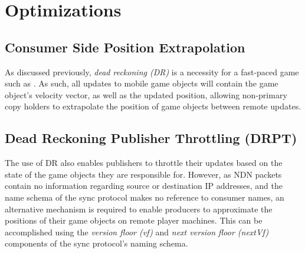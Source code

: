 




\section{\game{} Optimizations}\label{sec:des:dr}
\subsection{Consumer Side Position Extrapolation}
As discussed previously, \textit{dead reckoning (DR)} is a necessity for a fast-paced game such as \game{}. As such, all updates to mobile game objects will contain the game object's velocity vector, as well as the updated position, allowing non-primary copy holders to extrapolate the position of game objects between remote updates.

\subsection{Dead Reckoning Publisher Throttling (DRPT)}
The use of DR also enables publishers to throttle their updates based on the state of the game objects they are responsible for. However, as NDN packets contain no information regarding source or destination IP addresses, and the name schema of the sync protocol makes no reference to consumer names, an alternative mechanism is required to enable producers to approximate the positions of their game objects on remote player machines. This can be accomplished using the \textit{version floor (vf)} and \textit{next version floor (nextVf)} components of the sync protocol's naming schema.

